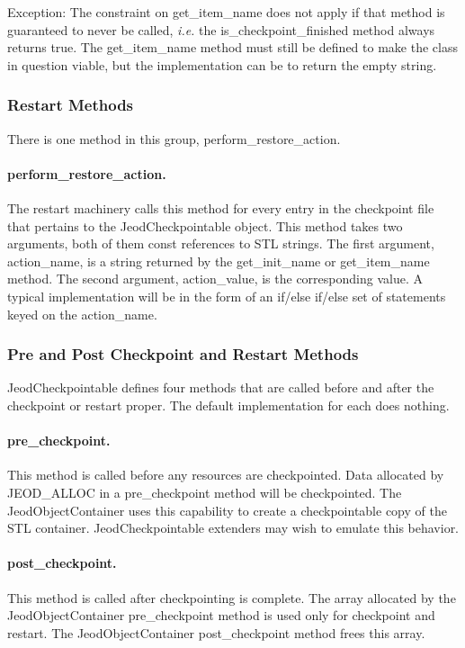 Exception: The constraint on get\_item\_name does not apply if that method is
guaranteed to never be called, \emph{i.e.} the is\_checkpoint\_finished method
always returns true. The get\_item\_name method must still be defined to make
the class in question viable, but the implementation can be to return the
empty string.

\subsubsection{Restart Methods}
There is one method in this group, perform\_restore\_action.
\paragraph{perform\_restore\_action.}
The restart machinery calls this method for every entry in the checkpoint
file that pertains to the JeodCheckpointable object. This method takes
two arguments, both of them const references to STL strings. The first argument,
action\_name, is a string returned by the get\_init\_name or get\_item\_name
method. The second argument, action\_value, is the corresponding value.
A typical implementation will be in the form of an if/else if/else set of
statements keyed on the action\_name. 

\subsubsection{Pre and Post Checkpoint and Restart Methods}
JeodCheckpointable defines four methods that are called before and
after the checkpoint or restart proper. The default implementation for
each does nothing.
\paragraph{pre\_checkpoint.}
This method is called before any resources are checkpointed.
Data allocated by JEOD\_ALLOC in a pre\_checkpoint method will be checkpointed.
The JeodObjectContainer uses this capability to create a checkpointable
copy of the STL container. JeodCheckpointable extenders may wish to
emulate this behavior.
\paragraph{post\_checkpoint.}
This method is called after checkpointing is complete.
The array allocated by the JeodObjectContainer pre\_checkpoint method
is used only for checkpoint and restart.
The JeodObjectContainer post\_checkpoint method frees this array.
